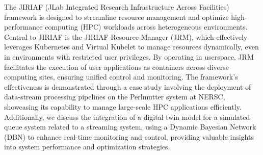 The JIRIAF (JLab Integrated Research Infrastructure Across Facilities) framework is designed to streamline resource management and optimize high-performance computing (HPC) workloads across heterogeneous environments. Central to JIRIAF is the JIRIAF Resource Manager (JRM), which effectively leverages Kubernetes and Virtual Kubelet to manage resources dynamically, even in environments with restricted user privileges. By operating in userspace, JRM facilitates the execution of user applications as containers across diverse computing sites, ensuring unified control and monitoring. The framework's effectiveness is demonstrated through a case study involving the deployment of data-stream processing pipelines on the Perlmutter system at NERSC, showcasing its capability to manage large-scale HPC applications efficiently. Additionally, we discuss the integration of a digital twin model for a simulated queue system related to a streaming system, using a Dynamic Bayesian Network (DBN) to enhance real-time monitoring and control, providing valuable insights into system performance and optimization strategies.
